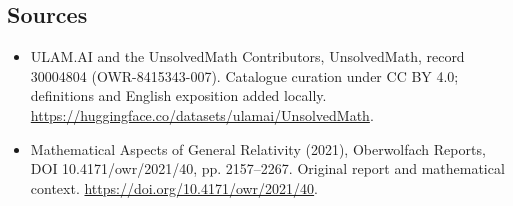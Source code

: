 \documentclass[11pt]{article}
\begin{document}
\subsection{Sources}
\begin{itemize}
\item[\hypertarget{source:30004804:1}{S1}] ULAM.AI and the UnsolvedMath Contributors, UnsolvedMath, record 30004804 (OWR-8415343-007). Catalogue curation under CC BY 4.0; definitions and English exposition added locally.
\url{https://huggingface.co/datasets/ulamai/UnsolvedMath}.
\item[\hypertarget{source:30004804:2}{S2}] Mathematical Aspects of General Relativity (2021), Oberwolfach Reports, DOI 10.4171/owr/2021/40, pp. 2157--2267. Original report and mathematical context.
\url{https://doi.org/10.4171/owr/2021/40}.
\end{itemize}
\label{end:30004804}
\end{document}
